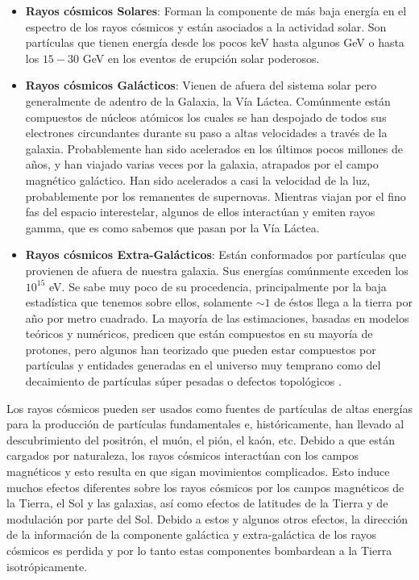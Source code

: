 \documentclass[a4paper,10pt]{article}
\numberwithin{equation}{section}
\begin{document}
\begin{itemize}
 \item \textbf{Rayos cósmicos Solares}: Forman la componente de más baja energía 
 en el espectro de los rayos cósmicos y están asociados a la actividad solar. Son 
 partículas que tienen energía desde los pocos keV hasta algunos GeV o hasta 
 los $15-30$ GeV en los eventos de erupción solar poderosos.
 \item \textbf{Rayos cósmicos Galácticos}: Vienen de afuera del sistema solar pero 
 generalmente de adentro de la Galaxia, la Vía Láctea. Comúnmente están compuestos 
 de núcleos atómicos los cuales se han despojado de todos sus electrones circundantes 
 durante su paso a altas velocidades a través de la galaxia. Probablemente han sido 
 acelerados en los últimos pocos millones de años, y han viajado varias veces por 
 la galaxia, atrapados por el campo magnético galáctico. Han sido acelerados a 
 casi la velocidad de la luz, probablemente por los remanentes de supernovas. Mientras 
 viajan por el fino fas del espacio interestelar, algunos de ellos interactúan y 
 emiten rayos gamma, que es como sabemos que pasan por la Vía Láctea.
 \item \textbf{Rayos cósmicos Extra-Galácticos}: Están conformados por partículas 
 que provienen de afuera de nuestra galaxia. Sus energías comúnmente exceden los 
 $10^{15}$ eV. Se sabe muy poco de su procedencia, principalmente por la baja 
 estadística que tenemos sobre ellos, solamente $\sim 1$ de éstos llega a la 
 tierra por año por metro cuadrado. La mayoría de las estimaciones, basadas en 
 modelos teóricos y numéricos, predicen que están compuestos en su mayoría 
 de protones, pero algunos han teorizado que pueden estar compuestos por 
 partículas y entidades generadas en el universo muy temprano como del 
 decaimiento de partículas súper pesadas o defectos topológicos \cite{nagano}.
\end{itemize}

Los rayos cósmicos pueden ser usados como fuentes de partículas de altas energías 
para la producción de partículas fundamentales e, históricamente, han llevado 
al descubrimiento del positrón, el muón, el pión, el kaón, etc. Debido a que 
están cargados por naturaleza, los rayos cósmicos interactúan con los 
campos magnéticos y esto resulta en que sigan movimientos complicados. Esto 
induce muchos efectos diferentes sobre los rayos cósmicos por los campos magnéticos 
de la Tierra, el Sol y las galaxias, así como efectos de latitudes de la Tierra 
y de modulación por parte del Sol. Debido a estos y algunos otros efectos, 
la dirección de la información de la componente galáctica y extra-galáctica 
de los rayos cósmicos es perdida y por lo tanto estas componentes bombardean 
a la Tierra isotrópicamente. 
\end{document}
